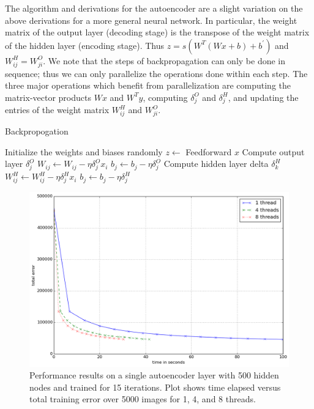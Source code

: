 \documentclass[conference]{IEEEtran}
\begin{document}
The algorithm and derivations for the autoencoder are a slight variation on the above derivations for a more general neural network. In particular, the weight matrix of the output layer (decoding stage) is the transpose of the weight matrix of the hidden layer (encoding stage). Thus $z=s(W^{T}(Wx + b) + b^{'})$ and $W^H_{ij} = W^O_{ji}$. We note that the steps of backpropagation can only be done in sequence; thus we can only parallelize the operations done within each step. The three major operations which benefit from parallelization are computing the matrix-vector products $Wx$ and $W^{T}y$, computing $\delta^O_j$ and $\delta^H_j$, and updating the entries of the weight matrix $W^H_{ij}$ and $W^O_{ji}$.

\begin{algorithm}[h]
\caption{Backpropogation}
\label{alg:backprop}
\begin{algorithmic}
\STATE Initialize the weights and biases randomly
		\STATE $z\gets$ Feedforward $x$
		\STATE Compute output layer $\delta_j^O$
		\STATE ${W_{ij} \leftarrow W_{ij} - \eta \delta^O_j x_i}$
		\STATE $b_j \leftarrow b_j - \eta\delta^O_j$
			\STATE Compute hidden layer delta $\delta_k^H$
			\STATE ${W^H_{ij} \leftarrow W^H_{ij} - \eta\delta^H_jx_i}$
			\STATE $b_j \leftarrow b_j - \eta\delta^H_j$
		\ENDFOR
	\ENDFOR
\ENDFOR
\end{algorithmic}
\end{algorithm}

\begin{figure}[h]
\centering
\includegraphics[width=0.9\linewidth]{experiment1.png}
\caption{Performance results on a single autoencoder layer with 500 hidden nodes and trained for 15 iterations. Plot shows time elapsed versus total training error over 5000 images for 1, 4, and 8 threads.}
\label{fig:experiment1}
\end{figure}
\end{document}
